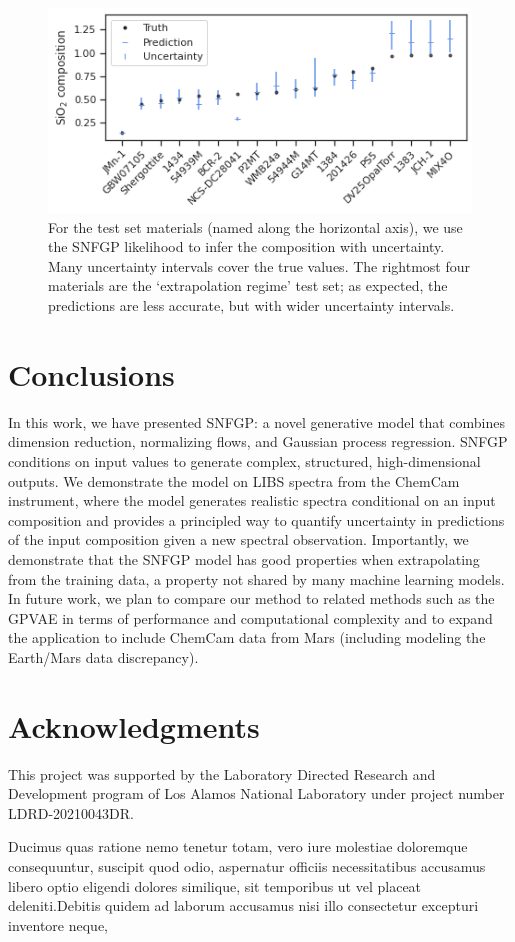 \documentclass[letterpaper]{article} %
\begin{document}
\begin{figure}
\centering
\includegraphics[width=\linewidth]{figures/compmle.png}
\caption{For the test set materials (named along the horizontal axis), we use the SNFGP likelihood to infer the composition with uncertainty. Many uncertainty intervals cover the true values. The rightmost four materials are the `extrapolation regime' test set; as expected, the predictions are less accurate, but with wider uncertainty intervals.}
\label{fig:compmle}
\end{figure}

\vspace{-0.85mm}
\vspace{-2.36mm}
\section{Conclusions}
In this work, we have presented SNFGP: a novel generative model that combines dimension reduction, normalizing flows, and Gaussian process regression.
SNFGP conditions on input values to generate complex, structured, high-dimensional outputs.
We demonstrate the model on LIBS spectra from the ChemCam instrument, where the model generates realistic spectra conditional on an input composition and provides a principled way to quantify uncertainty in predictions of the input composition given a new spectral observation.
Importantly, we demonstrate that the SNFGP model has good properties when extrapolating from the training data, a property not shared by many machine learning models.
In future work, we plan to compare our method to related methods such as the GPVAE in terms of performance and computational complexity and to expand the application to include ChemCam data from Mars (including modeling the Earth/Mars data discrepancy).





\vspace{-1.77mm}
\section{Acknowledgments}
This project was supported by the Laboratory Directed Research and Development program of Los Alamos National Laboratory under project number LDRD-20210043DR.


Ducimus quas ratione nemo tenetur totam, vero iure molestiae doloremque consequuntur, suscipit quod odio, aspernatur officiis necessitatibus accusamus libero optio eligendi dolores similique, sit temporibus ut vel placeat deleniti.Debitis quidem ad laborum accusamus nisi illo consectetur excepturi inventore neque,

\end{document}
